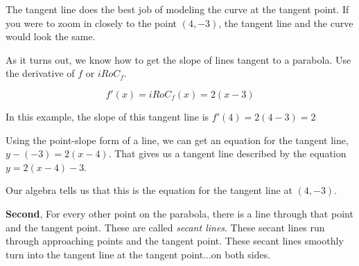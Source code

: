 \documentclass{ximera}
\begin{document}
\begin{image}
\end{image}



The tangent line does the best job of modeling the curve at the tangent point. If you were to zoom in closely to the point $(4, -3)$, the tangent line and the curve would look the same.


As it turns out, we know how to get the slope of lines tangent to a parabola.  Use the derivative of $f$ or $iRoC_f$.   

\[ 
f'(x)=iRoC_f(x) = 2 (x - 3)
\] 

In this example, the slope of this tangent line is $f'(4) = 2 (4-3) = 2$ 

Using the point-slope form of a line, we can get an equation for the tangent line, $y - (-3)=2 (x-4)$. That gives us a tangent line described by the equation $y = 2 (x - 4) - 3$.


Our algebra tells us that this is the equation for the tangent line at $(4, -3)$.








\textbf{Second}, For every other point on the parabola, there is a line through that point and the tangent point.  These are called \textit{secant lines}. These secant lines run through approaching points and the tangent point. These secant lines smoothly turn into the tangent line at the tangent point...on both sides.
\end{document}
